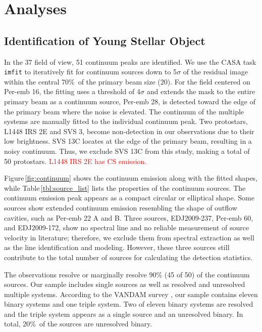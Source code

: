 \documentclass[twocolumn]{aastex62}
\begin{document}

% 

\section{Analyses}
\label{sec:analyses}

\subsection{Identification of Young Stellar Object}
\label{sec:continuum}
In the 37 field of view, 51 continuum peaks are identified.  We use the CASA task \texttt{imfit} to iteratively fit for continuum sources down to 5$\sigma$ of the residual image within the central 70\%\ of the primary beam size (20\arcsec).  For the field centered on Per-emb 16, the fitting uses a threshold of 4$\sigma$ and extends the mask to the entire primary beam as a continuum source, Per-emb 28, is detected toward the edge of the primary beam where the noise is elevated.  The continuum of the multiple systems are manually fitted to the individual continuum peak.  Two protostars, L1448 IRS 2E and SVS 3, become non-detection in our observations due to their low brightness.  SVS 13C locates at the edge of the primary beam, resulting in a noisy continuum.  Thus, we exclude SVS 13C from this study, making a total of 50 protostars.  \textcolor{red}{L1448 IRS 2E has CS emission.}



Figure\,\ref{fig:continuum} shows the continuum emission along with the fitted shapes, while Table\,\ref{tbl:source_list} lists the properties of the continuum sources.  The continuum emission peak appears as a compact circular or elliptical shape.  Some sources show extended continuum emission resembling the shape of outflow cavities, such as Per-emb 22 A and B.  Three sources, EDJ2009-237, Per-emb 60, and EDJ2009-172, show no spectral line and no reliable measurement of source velocity in literature; therefore, we exclude them from spectral extraction as well as the line identification and modeling.  However, these three sources still contribute to the total number of sources for calculating the detection statistics.

The observations resolve or marginally resolve 90\% (45 of 50) of the continuum sources.  Our sample includes single sources as well as resolved and unresolved multiple systems.  According to the VANDAM survey \citep{2016ApJ...818...73T}, our sample contains eleven binary systems and one triple system.  Two of eleven binary systems are resolved and the triple system appears as a single source and an unresolved binary.  In total, 20\%\ of the sources are unresolved binary. 
\end{document}
